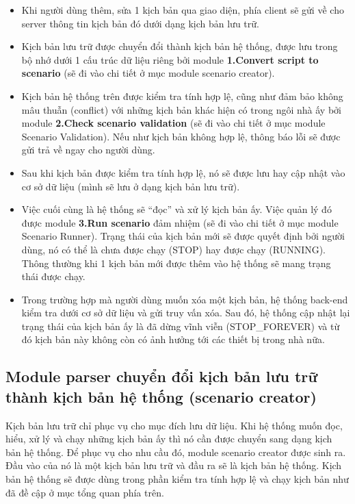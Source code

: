 \documentclass[12pt,a4paper,oneside]{extbook}
\begin{document}
	\begin{itemize}[topsep=1mm,itemsep=-0.5mm]
	\item Khi người dùng thêm, sửa 1 kịch bản qua giao diện, phía client sẽ gửi về cho server thông tin kịch bản đó dưới dạng kịch bản lưu trữ.
	\item Kịch bản lưu trữ được chuyển đổi thành kịch bản hệ thống, được lưu trong bộ nhớ dưới 1 cấu trúc dữ liệu riêng bởi module \textbf{1.Convert script to scenario} (sẽ đi vào chi tiết ở mục module scenario creator). 
	\item Kịch bản hệ thống trên được kiểm tra tính hợp lệ, cũng như đảm bảo không mâu thuẫn (conflict) với những kịch bản khác hiện có trong ngôi nhà ấy bởi module \textbf{2.Check scenario validation} (sẽ đi vào chi tiết ở mục module Scenario Validation). Nếu như kịch bản không hợp lệ, thông báo lỗi sẽ được gửi trả về ngay cho người dùng.
	\item Sau khi kịch bản được kiểm tra tính hợp lệ, nó sẽ được lưu hay cập nhật vào cơ sở dữ liệu (mình sẽ lưu ở dạng kịch bản lưu trữ). 
	\item Việc cuối cùng là hệ thống sẽ “đọc” và xử lý kịch bản ấy. Việc quản lý đó được module \textbf{3.Run scenario} đảm nhiệm (sẽ đi vào chi tiết ở mục module Scenario Runner). Trạng thái của kịch bản mới sẽ được quyết định bởi người dùng, nó có thể là chưa được chạy (STOP) hay được chạy (RUNNING). Thông thường khi 1 kịch bản mới được thêm vào hệ thống sẽ mang trạng thái được chạy.
	\item Trong trường hợp mà người dùng muốn xóa một kịch bản, hệ thống back-end kiểm tra dưới cơ sở dữ liệu và gửi truy vấn xóa. Sau đó, hệ thống cập nhật lại trạng thái của kịch bản ấy là đã dừng vĩnh viễn (STOP\_FOREVER) và từ đó kịch bản này không còn có ảnh hưởng tới các thiết bị trong nhà nữa. 
	\vspace{1mm}
	\end{itemize}
	
\subsection{Module parser chuyển đổi kịch bản lưu trữ thành kịch bản hệ thống (scenario creator)}

Kịch bản lưu trữ chỉ phục vụ cho mục đích lưu dữ liệu. Khi hệ thống muốn đọc, hiểu, xử lý và chạy những kịch bản ấy thì nó cần được chuyển sang dạng kịch bản hệ thống. Để phục vụ cho nhu cầu đó, module scenario creator được sinh ra. Đầu vào của nó là một kịch bản lưu trữ và đầu ra sẽ là kịch bản hệ thống. Kịch bản hệ thống sẽ được dùng trong phần kiểm tra tính hợp lệ và chạy kịch bản như đã đề cập ở mục tổng quan phía trên.
\end{document}
